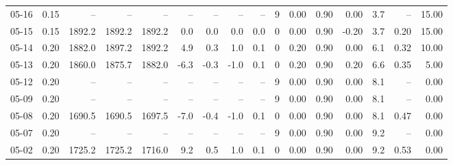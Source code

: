 \begin{threeparttable}
{\begin{tabular}{lrrrrrrrrrrrrrrr}
  05-16 &     0.15 &     -- &     -- &     -- &         -- &             -- &                       -- &                  -- &              9 &       0.00 &      0.90 &           0.00 &              3.7 &              -- &                  15.00 \\
  05-15 &     0.15 & 1892.2 & 1892.2 & 1892.2 &        0.0 &            0.0 &                      0.0 &                 0.0 &              0 &       0.00 &      0.90 &          -0.20 &              3.7 &            0.20 &                  15.00 \\
  05-14 &     0.20 & 1882.0 & 1897.2 & 1892.2 &        4.9 &            0.3 &                      1.0 &                 0.1 &              0 &       0.20 &      0.90 &           0.00 &              6.1 &            0.32 &                  10.00 \\
  05-13 &     0.20 & 1860.0 & 1875.7 & 1882.0 &       -6.3 &           -0.3 &                     -1.0 &                 0.1 &              0 &       0.20 &      0.90 &           0.20 &              6.6 &            0.35 &                   5.00 \\
  05-12 &     0.20 &     -- &     -- &     -- &         -- &             -- &                       -- &                  -- &              9 &       0.00 &      0.90 &           0.00 &              8.1 &              -- &                   0.00 \\
  05-09 &     0.20 &     -- &     -- &     -- &         -- &             -- &                       -- &                  -- &              9 &       0.00 &      0.90 &           0.00 &              8.1 &              -- &                   0.00 \\
  05-08 &     0.20 & 1690.5 & 1690.5 & 1697.5 &       -7.0 &           -0.4 &                     -1.0 &                 0.1 &              0 &       0.00 &      0.90 &           0.00 &              8.1 &            0.47 &                   0.00 \\
  05-07 &     0.20 &     -- &     -- &     -- &         -- &             -- &                       -- &                  -- &              9 &       0.00 &      0.90 &           0.00 &              9.2 &              -- &                   0.00 \\
  05-02 &     0.20 & 1725.2 & 1725.2 & 1716.0 &        9.2 &            0.5 &                      1.0 &                 0.1 &              0 &       0.00 &      0.90 &           0.00 &              9.2 &            0.53 &                   0.00 \\

\end{tabular}}
\end{threeparttable}
